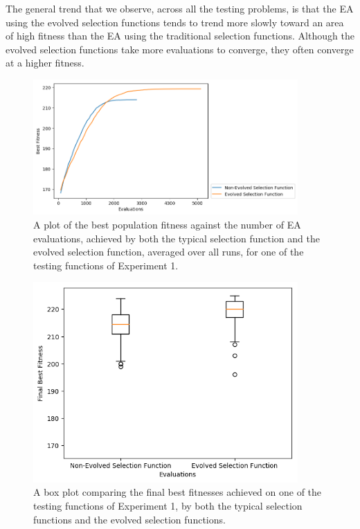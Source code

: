 \documentclass[times,12pt,titlepage]{mstogs}
\begin{document}
\begin{ThesisBody}
The general trend that we observe, across all the testing problems, is that the EA using the evolved selection functions tends to trend more slowly toward an area of high fitness than the EA using the traditional selection functions. Although the evolved selection functions take more evaluations to converge, they often converge at a higher fitness.
\begin{figure}
    \centering
    \includegraphics[width=0.9\textwidth]{Experiment1LinePlot}
    \caption{A plot of the best population fitness against the number of EA evaluations, achieved by both the typical selection function and the evolved selection function, averaged over all runs, for one of the testing functions of Experiment 1.}
    \label{fig:Experiment1LinePlot}
\end{figure}

\begin{figure}
    \centering
    \includegraphics[width=0.9\textwidth]{Experiment1Boxplot}
    \caption{A box plot comparing the final best fitnesses achieved on one of the testing functions of Experiment 1, by both the typical selection functions and the evolved selection functions.}
    \label{fig:Experiment1Boxplot}
\end{figure}


\end{ThesisBody}
\end{document}
